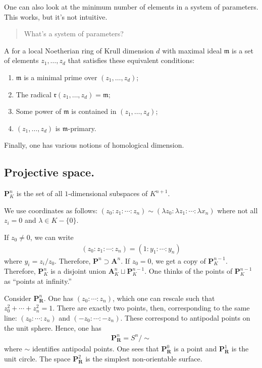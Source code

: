 \documentclass [11 pt, oneside] {article}
\begin{document}
One can also look at the minimum number of elements in a system of parameters. This works, but it's not intuitive. 
\begin{quote}
	\small What's a system of parameters?
\end{quote}
A  for a local Noetherian ring of Krull dimension $d$ with maximal ideal $\mathfrak{m}$ is a set of elements $z_1,\hdots, z_d$ that satisfies these equivalent conditions:
\begin{enumerate}
	\item $\mathfrak{m}$ is a minimal prime over $(z_1,\hdots, z_d)$;
	\item The radical $\mathfrak{r}{(z_1,\hdots, z_d)}=\mathfrak{m} $;
	\item Some power of $\mathfrak{m}$ is contained in $(z_1,\hdots, z_d)$;
	\item $(z_1,\hdots, z_d)$ is $\mathfrak{m}$-primary.
\end{enumerate}

Finally, one has various notions of homological dimension.

\subsection{Projective space.}
\begin{definition}[ ]\label{}
 $\mathbf{P}^n_K$ is the set of all $1$-dimensional subspaces of $K^{n+1}$.
\end{definition}

We use coordinates as follows: $(z_0:z_1:\cdots : z_n)\sim (\lambda z_0:\lambda z_1:\cdots:\lambda x_n)$ where not all $z_i=0$ and $\lambda\in K - \{0\}$.

If $z_0\ne 0$, we can write
\begin{align*}
	(z_0:z_1:\cdots:z_n) = (1:y_1:\cdots : y_n)
\end{align*}
where $y_i = z_i/z_0$. Therefore, $\mathbf{P}^n \supset \mathbf{A}^n$. If $z_0=0$, we get a copy of $\mathbf{P}^{n-1}_K$. Therefore, $\mathbf{P}^n_K$ is a disjoint union $\mathbf{A}^n_K \sqcup \mathbf{P}^{n-1}_K $. One thinks of the points of $\mathbf{P}^{n-1}_K$ as ``points at infinity.''

Consider $\mathbf{P}^n_{\mathbf{R}}$. One has $(z_0:\cdots:z_n)$, which one can rescale such that $z_0^2 +\cdots+z_n^2 = 1$. There are exactly two points, then, corresponding to the same line: $(z_0:\cdots:z_n)$ and $(-z_0:\cdots:-z_n)$. These correspond to antipodal points on the unit sphere. Hence, one has
\begin{align*}
	\mathbf{P}^n_{\mathbf{R}} = S^n / \sim
\end{align*}
where $\sim$ identifies antipodal points. One sees that $\mathbf{P}^0_{\mathbf{R}}$ is a point and $\mathbf{P}^1_{\mathbf{R}}$ is the unit circle. The space $\mathbf{P}^2_{\mathbf{R}}$ is the simplest non-orientable surface.
\end{document}
